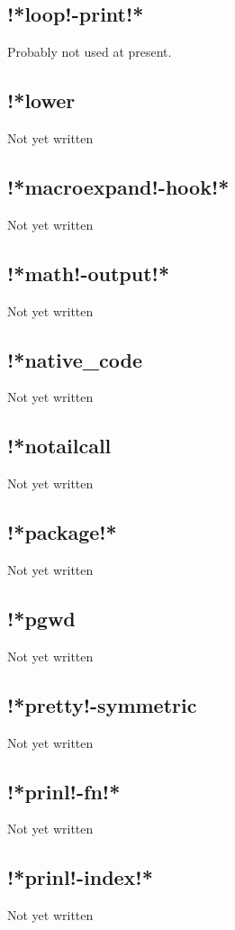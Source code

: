 \documentclass[a4paper,11pt]{article}
\begin{document}
\subsection{\ttfamily !*loop!-print!*}
Probably not used at present.

\subsection{\ttfamily !*lower}
Not yet written

\subsection{\ttfamily !*macroexpand!-hook!*}
Not yet written

\subsection{\ttfamily !*math!-output!*}
Not yet written

\subsection{\ttfamily !*native\_code}
Not yet written

\subsection{\ttfamily !*notailcall}
Not yet written

\subsection{\ttfamily !*package!*}
Not yet written

\subsection{\ttfamily !*pgwd}
Not yet written

\subsection{\ttfamily !*pretty!-symmetric}
Not yet written

\subsection{\ttfamily !*prinl!-fn!*}
Not yet written

\subsection{\ttfamily !*prinl!-index!*}
Not yet written
\end{document}
